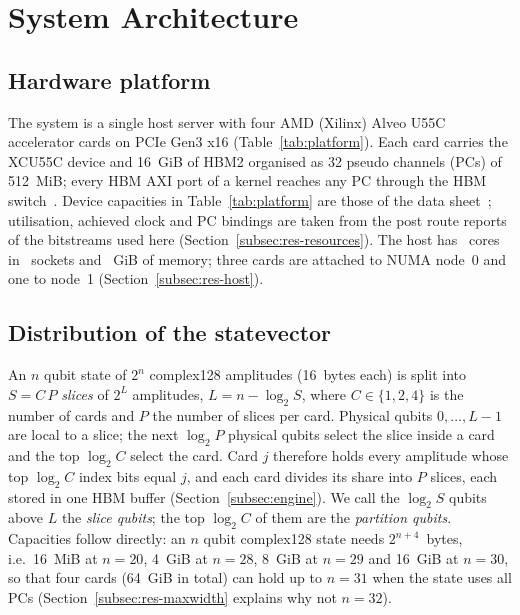 \section{System Architecture}\label{sec:architecture}

\subsection{Hardware platform}\label{subsec:hw}

The system is a single host server with four AMD (Xilinx) Alveo U55C accelerator cards on PCIe Gen3 x16
(Table~\ref{tab:platform}). Each card carries the XCU55C device and 16~GiB of HBM2 organised as 32 pseudo channels
(PCs) of 512~MiB; every HBM AXI port of a kernel reaches any PC through the HBM switch~\cite{amd_ds978,amd_ug1393}.
Device capacities in Table~\ref{tab:platform} are those of the data sheet~\cite{amd_ds978}; utilisation, achieved
clock and PC bindings are taken from the post route reports of the bitstreams used here (Section~\ref{subsec:res-resources}).
The host has \NumHostCores~cores in \NumHostSockets~sockets and \NumHostRamGiB~GiB of memory; three cards are attached
to NUMA node~0 and one to node~1 (Section~\ref{subsec:res-host}).

\begin{table}[t]
\caption{Platform. Device values from the AMD U55C data sheet~\cite{amd_ds978}; host values captured by script at
measurement time (\texttt{results/hardware\_manifest.json}).}\label{tab:platform}

\end{table}

\subsection{Distribution of the statevector}\label{subsec:partition}

An $n$ qubit state of $2^n$ complex128 amplitudes (16~bytes each) is split into $S = C\,P$ \emph{slices} of $2^L$
amplitudes, $L = n - \log_2 S$, where $C \in \{1,2,4\}$ is the number of cards and $P$ the number of slices per card.
Physical qubits $0,\dots,L-1$ are local to a slice; the next $\log_2 P$ physical qubits select the slice inside a card
and the top $\log_2 C$ select the card. Card $j$ therefore holds every amplitude whose top $\log_2 C$ index bits
equal $j$, and each card divides its share into $P$ slices, each stored in one HBM buffer (Section~\ref{subsec:engine}). We call the
$\log_2 S$ qubits above $L$ the \emph{slice qubits}; the top $\log_2 C$ of them are the \emph{partition qubits}. Capacities follow directly: an $n$ qubit complex128 state needs $2^{n+4}$~bytes, i.e.\ 16~MiB at
$n=20$, 4~GiB at $n=28$, 8~GiB at $n=29$ and 16~GiB at $n=30$, so that four cards (64~GiB in total) can hold
up to $n = 31$ when the state uses all PCs (Section~\ref{subsec:res-maxwidth} explains why not $n=32$).

